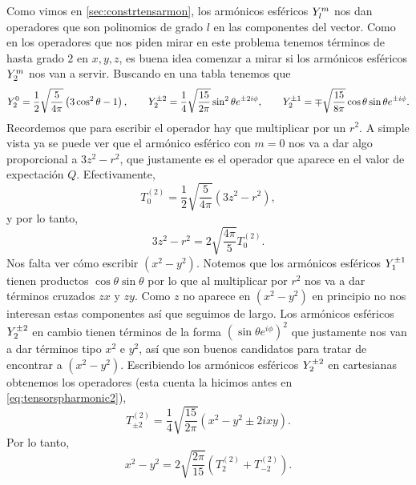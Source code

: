 \documentclass[10pt, a4paper]{article}
\numberwithin{equation}{subsection}
\begin{document}
Como vimos en \ref{sec:constrtensarmon}, los armónicos esféricos
$\SphericalHarmonic{l}{m}$ nos dan operadores que son polinomios de grado $l$
en las componentes del vector. Como en los operadores que nos piden mirar en
este problema tenemos términos de hasta grado $2$ en $x,y,z$, es buena idea
comenzar a mirar si los armónicos esféricos $\SphericalHarmonic{2}{m}$ nos van
a servir. Buscando en una tabla tenemos que
\begin{equation}
  \SphericalHarmonic{2}{0} = \frac{1}{2}\sqrt{\frac{5}{4\pi}}
    \left(3\cos^2\theta - 1\right), \qquad
  \SphericalHarmonic{2}{\pm2} = \frac{1}{4}\sqrt{\frac{15}{2\pi}}\sin^2\theta
    e^{\pm2i\phi}, \qquad
  \SphericalHarmonic{2}{\pm1} = \mp\sqrt{\frac{15}{8\pi}}\cos\theta\sin\theta
    e^{\pm i\phi}.
\end{equation}
Recordemos que para escribir el operador hay que multiplicar por un $r^2$.
A simple vista ya se puede ver que el armónico esférico con $m = 0$ nos va a
dar algo proporcional a $3z^2 - r^2$, que justamente es el operador que aparece
en el valor de expectación $Q$. Efectivamente,
\begin{equation}
  T^{(2)}_0 = \frac{1}{2}\sqrt{\frac{5}{4\pi}}\left(3z^2 - r^2\right),
\end{equation}
y por lo tanto,
\begin{equation}
  3z^2 - r^2  = 2\sqrt{\frac{4\pi}{5}} T^{(2)}_0.
\end{equation}
Nos falta ver cómo escribir $(x^2 - y^2)$. Notemos que los armónicos esféricos
$\SphericalHarmonic{1}{\pm1}$ tienen productos $\cos\theta\sin\theta$ por lo
que al multiplicar por $r^2$ nos va a dar términos cruzados $zx$ y $zy$. Como
$z$ no aparece en $(x^2 - y^2)$ en principio no nos interesan estas componentes
así que seguimos de largo. Los armónicos esféricos
$\SphericalHarmonic{2}{\pm2}$ en cambio tienen términos de la forma
$\left(\sin\theta e^{i\phi}\right)^2$ que justamente nos van a dar términos
tipo $x^2$ e $y^2$, así que son buenos candidatos para tratar de encontrar a
$(x^2 - y^2)$. Escribiendo los armónicos esféricos
$\SphericalHarmonic{2}{\pm2}$ en cartesianas obtenemos los operadores (esta
cuenta la hicimos antes en \eqref{eq:tensorspharmonic2}),
\begin{equation}
  T^{(2)}_{\pm2} = \frac{1}{4}\sqrt{\frac{15}{2\pi}}\left(x^2 - y^2
    \pm2ixy\right).
\end{equation}
Por lo tanto,
\begin{equation}
  x^2 - y^2 = 2\sqrt{\frac{2\pi}{15}}\left(T^{(2)}_{2} + T^{(2)}_{-2}\right).
\end{equation}
\end{document}
